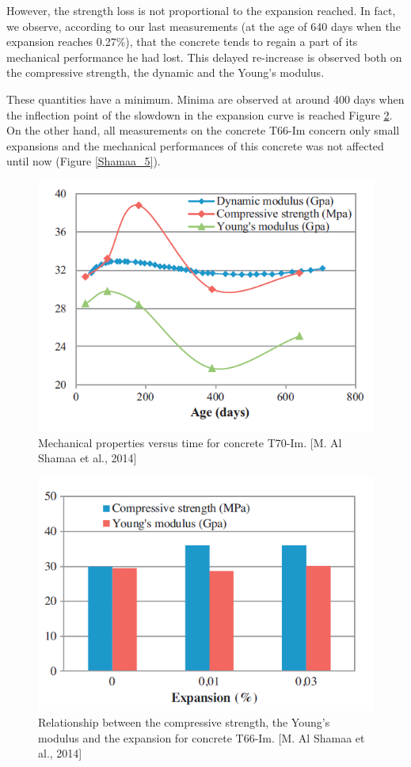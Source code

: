 However, the strength loss is not proportional to the expansion reached. In fact, we observe, according to our last measurements (at the age of 640 days when the expansion reaches 0.27\%), that the concrete tends to regain a part of its mechanical performance he had lost. This delayed re-increase is observed both on the compressive strength, the dynamic and the Young’s modulus.

These quantities have a minimum. Minima are observed at around 400 days when the inflection point of the slowdown in the expansion curve is reached Figure \ref{Shamaa_4}. On the other hand, all measurements on the concrete T66-Im concern only small expansions and the mechanical performances of this concrete was not affected until now (Figure \ref{Shamaa_5}).

\begin{figure}[h!]
  \centering
  \includegraphics[width=0.8\linewidth]{Reference/Shamaa4.png}
  \caption{Mechanical properties versus time for concrete T70-Im. [M. Al Shamaa et al., 2014]}
  \label{Shamaa_4}
\end{figure}

\begin{figure}[h!]
  \centering
  \includegraphics[width=0.8\linewidth]{Reference/Shamaa5.png}
  \caption{Relationship between the compressive strength, the Young’s modulus and
the expansion for concrete T66-Im. [M. Al Shamaa et al., 2014]}
  \label{Shamaa_4}
\end{figure}
